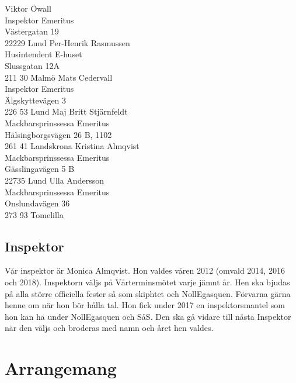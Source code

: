 \documentclass[10pt]{article}
\begin{document}
    \vbox{
    Viktor Öwall\\
    Inspektor Emeritus\\
    Västergatan 19\\
    22229 Lund
    }
    \vspace*{\baselineskip}
    \vbox{
    Per-Henrik Rasmussen\\
    Husintendent E-huset\\
    Slussgatan 12A\\
    211 30 Malmö
    }
    \vspace*{\baselineskip}
    \vbox{
    Mats Cedervall\\
    Inspektor Emeritus\\
    Älgskyttevägen 3\\
    226 53 Lund
    }
    \vspace*{\baselineskip}
    \vbox{
    Maj Britt Stjärnfeldt\\
    Mackbarsprinssessa Emeritus\\
    Hälsingborgsvägen 26 B, 1102\\
    261 41 Landskrona
    }
    \vspace*{\baselineskip}
    \vbox{
    Kristina Almqvist\\
    Mackbarsprinssessa Emeritus\\
    Gässlingavägen 5 B\\
    22735 Lund
    }
    \vspace*{\baselineskip}
    \vbox{
    Ulla Andersson\\
    Mackbarsprinssessa Emeritus\\
    Onslundavägen 36\\
    273 93 Tomelilla
    }
    
    \subsection{Inspektor}
    
    Vår inspektor är Monica Almqvist. Hon valdes våren 2012 (omvald 2014, 2016 och 2018). Inspektorn väljs på Vårterminsmötet varje jämnt år. Hen ska bjudas på alla större officiella fester så som skiphtet och NollEgasquen. Förvarna gärna henne om när hon bör hålla tal. Hon fick under 2017 en inspektorsmantel som hon kan ha under NollEgasquen och SåS. Den ska gå vidare till nästa Inspektor när den väljs och broderas med namn och året hen valdes.
    
    \section{Arrangemang}
    
\end{document}
